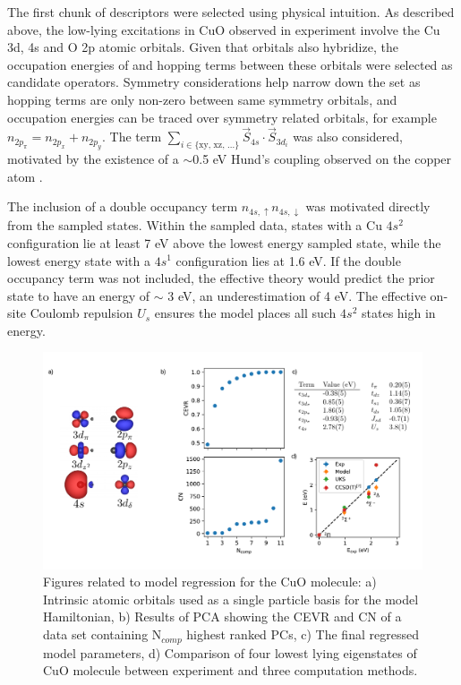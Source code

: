 \documentclass[12pt]{article}
\begin{document}
The first chunk of descriptors were selected using physical intuition.
As described above, the low-lying excitations in CuO observed in experiment involve the Cu 3d, 4s and O 2p atomic orbitals.
Given that orbitals also hybridize, the occupation energies of and hopping terms between these orbitals were selected as candidate operators.
Symmetry considerations help narrow down the set as hopping terms are only non-zero between same symmetry orbitals, and occupation energies can be traced over symmetry related orbitals, for example $n_{2p_\pi} = n_{2p_x} + n_{2p_y}$.
The term $\sum_{i\in {\{\text{xy, xz, ...}}\}} \vec{S}_{4s} \cdot \vec{S}_{3d_i}$ was also considered, motivated by the existence of a $\sim $0.5 eV Hund's coupling observed on the copper atom \cite{Data2009}.

The inclusion of a double occupancy term $n_{4s,\uparrow} n_{4s,\downarrow}$ was motivated directly from the sampled states.
Within the sampled data, states with a Cu $4s^{2}$ configuration lie at least 7 eV above the lowest energy sampled state, while the lowest energy state with a $4s^{1}$ configuration lies at 1.6 eV.
If the double occupancy term was not included, the effective theory would predict the prior state to have an energy of $\sim $ 3 eV, an underestimation of 4 eV.
The effective on-site Coulomb repulsion $U_s$ ensures the model places all such $4s^{2}$ states high in energy.

\begin{figure}
\centering
\includegraphics[width=1.0\linewidth]{./figs/cuo_regr_2.pdf}
\caption{Figures related to model regression for the CuO molecule: a) Intrinsic atomic orbitals used as a single particle basis for the model Hamiltonian, b) Results of PCA showing the CEVR and CN of a data set containing N$_{comp}$  highest ranked PCs, c) The final regressed model parameters, d) Comparison of four lowest lying eigenstates of CuO molecule between experiment and three computation methods.}
\label{fig:cuo_regr}
\end{figure}
\end{document}
